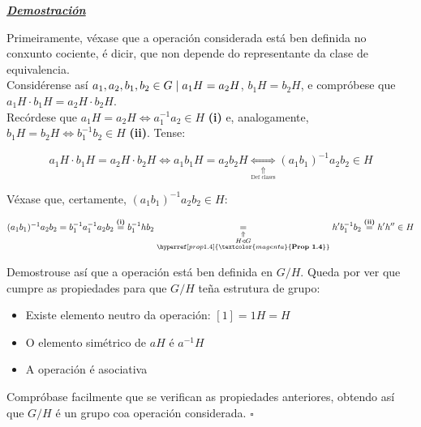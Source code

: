 \documentclass[twoside]{report}
\newcommand{\magbf}[1]{\textcolor{magenta}{\textbf{#1}}} %
\theoremstyle{mystyle}
\begin{document}
\vspace{2mm}

\noindent \textbf{\textit{\underline{Demostración}}}

\vspace{2mm}

\noindent Primeiramente, véxase que a operación considerada está ben definida no conxunto cociente, é dicir, que non depende do representante da clase de equivalencia. \\

\noindent Considérense así $a_{1},a_{2},b_{1},b_{2} \in G \hspace{1mm}| \hspace{1mm} a_{1}H = a_{2}H$, $b_{1}H = b_{2}H$, e compróbese que $a_{1}H \cdot b_{1}H = a_{2}H \cdot b_{2}H$. \\

\noindent Recórdese que $a_{1}H = a_{2}H \Longleftrightarrow a_{1}^{-1}a_{2} \in H$ \textbf{(i)} e, analogamente, $b_{1}H = b_{2}H \Longleftrightarrow b_{1}^{-1}b_{2} \in H$ \textbf{(ii)}. Tense:

$$a_{1}H \cdot b_{1}H = a_{2}H \cdot b_{2}H \Longleftrightarrow a_{1}b_{1}H = a_{2}b_{2}H \underset{\underset{\text{Def clases}}{\Uparrow}}{\Longleftrightarrow} (a_{1}b_{1})^{-1}a_{2}b_{2} \in H$$

\noindent Véxase que, certamente, $(a_{1}b_{1})^{-1}a_{2}b_{2} \in H$:

$$(a_{1}b_{1})^{-1}a_{2}b_{2} = b_{1}^{-1}a_{1}^{-1}a_{2}b_{2} \overset{\textbf{(i)}}{=} b_{1}^{-1}hb_{2} \underset{\underset{\substack{H \triangleleft G \\ \hyperref[prop1.4]{\magbf{Prop 1.4}}}}{\Uparrow}}{=} h'b_{1}^{-1}b_{2} \overset{\textbf{(ii)}}{=} h'h'' \in H$$

\noindent Demostrouse así que a operación está ben definida en $G/H$. Queda por ver que cumpre as propiedades para que $G/H$ teña estrutura de grupo:

\begin{itemize}
    \item Existe elemento neutro da operación: $[1] = 1H = H$
    \item O elemento simétrico de $aH$ é $a^{-1}H$
    \item A operación é asociativa
\end{itemize}

\noindent Compróbase facilmente que se verifican as propiedades anteriores, obtendo así que $G/H$ é un grupo coa operación considerada. $\square$
\end{document}
